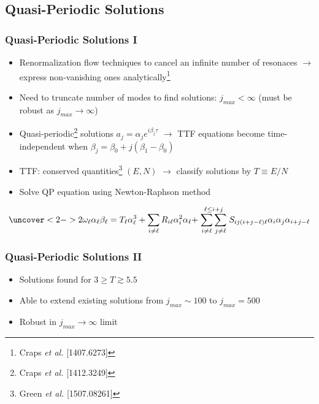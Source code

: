 \documentclass[mathserif,10pt]{beamer}
\newcommand{\bi}{\begin{itemize}}
\newcommand{\ei}{\end{itemize}}
\newcommand{\its}{\item}
\newcommand{\scr}{\scriptsize}
\newcommand{\jm}{j_{max}}
\begin{document}
{\subsection{Quasi-Periodic Solutions}
\frame
{
  \frametitle{Quasi-Periodic Solutions I}
  \bi 
  \its Renormalization flow techniques to cancel an infinite number of resonaces $\to$ express non-vanishing ones analytically\footnote<1->{{\scr Craps {\it et al.} [1407.6273]}}
  \its Need to truncate number of modes to find solutions: $\jm < \infty$ (must be robust as $\jm \to \infty$)
  \its<2->{Quasi-periodic\footnote<2->{{\scr Craps {\it et al.} [1412.3249]}} solutions $a_j = \alpha_j e^{i \beta_j \tau}$ $\to$ TTF equations become time-independent when $\beta_j = \beta_0 + j(\beta_1 - \beta_0)$}
  \its<2->{TTF: conserved quantities\footnote<2->{{\scr Green {\it et al.} [1507.08261]}} $(E, N)$ $\to$ classify solutions by $T \equiv E/N$}
  \its<2->{Solve QP equation using Newton-Raphson method}
  \ei
  \vspace{-0.15in}
  \begin{overlayarea}{\textwidth}{0.2\textheight}
   \begin{align*}
   \uncover<2->{
  2\omega_\ell \alpha_\ell \beta_\ell = T_\ell \alpha_\ell^3 + \sum_{i \neq \ell} R_{i\ell} \alpha_i^2 \alpha_\ell + \stackrel{\ell \leq i + j}{\sum_{i \neq \ell} \sum_{j \neq \ell}} S_{i j (i+j-\ell)\ell} \alpha_i \alpha_j \alpha_{i+j-\ell}
  }
  \end{align*}
  \end{overlayarea}
}

\frame
{
  \frametitle{Quasi-Periodic Solutions II}
  \bi
  \its Solutions found for $3 \geq T \gtrsim 5.5$
  \its Able to extend existing solutions from $\jm \sim 100$ to $\jm = 500$
  \its Robust in $\jm \to \infty$ limit
  \ei
  
}}
\end{document}
